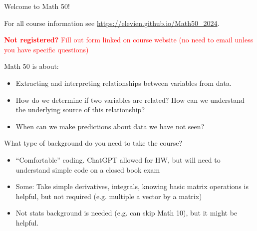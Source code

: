 \documentclass[serif,mathserif]{beamer}
\begin{document}

\begin{frame}
\centering
{\Large {Welcome to Math 50!}}
\centering

\vspace{1cm}
For all course information see \url{https://elevien.github.io/Math50_2024}.

 \vspace{1cm}
 \textcolor{red}{{\bf Not registered?} Fill out form linked on course website (no need to email unless you have specific questions)}



\end{frame}

\begin{frame}


Math 50 is about:
\begin{itemize}
\item  Extracting and interpreting relationships between variables from data. \pause
\item How do we determine if two variables are related? How can we understand the underlying source of this relationship? 
\item When can we make predictions about data we have not seen? 
\end{itemize}
\end{frame}


\begin{frame}
What type of background do you need to take the course? \pause 
\begin{itemize}
\item ``Comfortable'' coding. ChatGPT allowed for HW, but will need to understand simple code on a closed book exam\pause 
\item Some: Take simple derivatives, integrals, knowing basic matrix operations is helpful, but not required (e.g. multiple a vector by a matrix)\pause 
\item Not stats background is needed (e.g. can skip Math 10), but it might be helpful.  
\end{itemize}
\end{frame}

%
%
%
\end{document}
